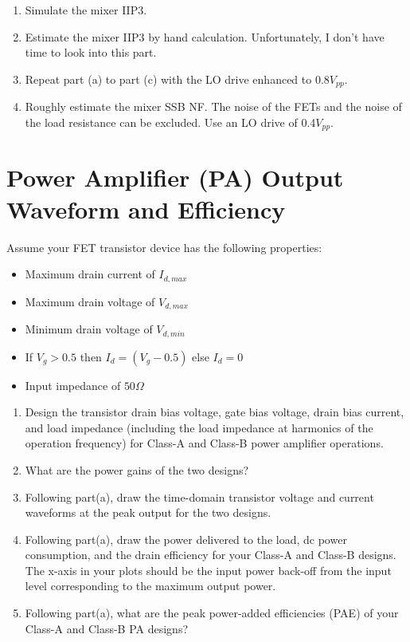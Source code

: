 \begin{enumerate}[label=(\alph*)]
    \item {\color{blue} Simulate the mixer IIP3.}

    \item {\color{blue} Estimate the mixer IIP3 by hand calculation.}
    Unfortunately, I don't have time to look into this part.

    \item {\color{blue} Repeat part (a) to part (c) with the LO drive enhanced to 0.8$V_{pp}$.}

    \item {\color{blue} Roughly estimate the mixer SSB NF. The noise of the FETs and the noise of the load resistance can be excluded. Use an LO drive of 0.4$V_{pp}$.}
\end{enumerate}

\section{Power Amplifier (PA) Output Waveform and Efficiency}
{\color{blue} Assume your FET transistor device has the following properties:
\begin{itemize}
    \item Maximum drain current of $I_{d,max}$
    \item Maximum drain voltage of $V_{d,max}$
    \item Minimum drain voltage of $V_{d,min}$
    \item If $V_g > 0.5$ then $I_d = (V_g - 0.5)$ else $I_d = 0$
    \item Input impedance of $50 \Omega$
\end{itemize}}

\begin{enumerate}[label=(\alph*)]
    \item {\color{blue} Design the transistor drain bias voltage, gate bias voltage, drain bias current, and load impedance (including the load impedance at harmonics of the operation frequency) for Class-A and Class-B power amplifier operations.}

    \item {\color{blue} What are the power gains of the two designs?}

    \item {\color{blue} Following part(a), draw the time-domain transistor voltage and current waveforms at the peak output for the two designs.}

    \item {\color{blue} Following part(a), draw the power delivered to the load, dc power consumption, and the drain efficiency for your Class-A and Class-B designs. The x-axis in your plots should be the input power back-off from the input level corresponding to the maximum output power.}

    \item {\color{blue} Following part(a), what are the peak power-added efficiencies (PAE) of your Class-A and Class-B PA designs?}
\end{enumerate}


